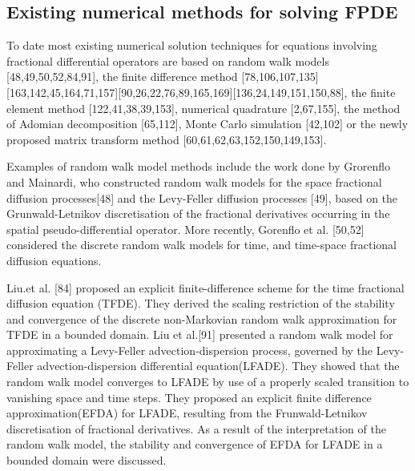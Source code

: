 {\subsection{Existing numerical methods for solving FPDE}
To date most existing numerical solution techniques for equations involving fractional differential operators are based on random walk models [48,49,50,52,84,91], the finite difference method [78,106,107,135] [163,142,45,164,71,157][90,26,22,76,89,165,169][136,24,149,151,150,88], the finite element method [122,41,38,39,153], numerical quadrature [2,67,155], the method of Adomian decomposition [65,112], Monte Carlo simulation [42,102] or the newly proposed matrix transform method [60,61,62,63,152,150,149,153].\

Examples of random walk model methods include the work done by Grorenflo and Mainardi, who constructed random walk models for the space fractional diffusion processes[48] and the Levy-Feller diffusion processes [49], based on the Grunwald-Letnikov discretisation of the fractional derivatives occurring in the spatial pseudo-differential operator. More recently, Gorenflo et al. [50,52] considered the discrete random walk models for time, and time-space fractional diffusion equations.\

Liu.et al. [84] proposed an explicit finite-difference scheme for the time fractional diffusion equation (TFDE). They derived the scaling restriction of the stability and convergence of the discrete non-Markovian random walk approximation for TFDE in a bounded domain. Liu et al.[91] presented a random walk model for approximating a Levy-Feller advection-dispersion process, governed by the Levy-Feller advection-dispersion differential equation(LFADE). They showed that the random walk model converges to LFADE by use of a properly scaled transition to vanishing space and time steps. They proposed an explicit finite difference approximation(EFDA) for LFADE, resulting from the Frunwald-Letnikov discretisation of fractional derivatives. As a result of the interpretation of the random walk model, the stability and convergence of EFDA for LFADE in a bounded domain were discussed.\

}
